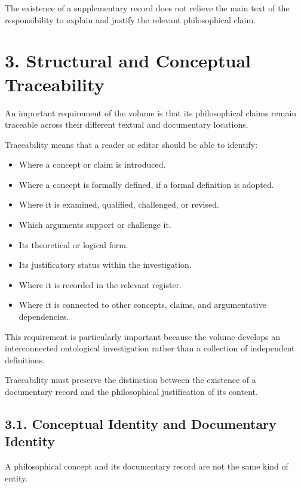 The existence of a supplementary record does
not relieve the main text of the responsibility
to explain and justify the relevant philosophical
claim.


\section*{3. Structural and Conceptual Traceability}

An important requirement of the volume is that
its philosophical claims remain traceable across
their different textual and documentary locations.

Traceability means that a reader or editor should
be able to identify:

\begin{itemize}
    \item Where a concept or claim is introduced.
    \item Where a concept is formally defined,
    if a formal definition is adopted.
    \item Where it is examined, qualified, challenged,
    or revised.
    \item Which arguments support or challenge it.
    \item Its theoretical or logical form.
    \item Its justificatory status within the investigation.
    \item Where it is recorded in the relevant register.
    \item Where it is connected to other concepts,
    claims, and argumentative dependencies.
\end{itemize}

This requirement is particularly important because
the volume develops an interconnected ontological
investigation rather than a collection of independent
definitions.

Traceability must preserve the distinction between
the existence of a documentary record and the
philosophical justification of its content.

\subsection*{3.1. Conceptual Identity and Documentary Identity}

A philosophical concept and its documentary record
are not the same kind of entity.

